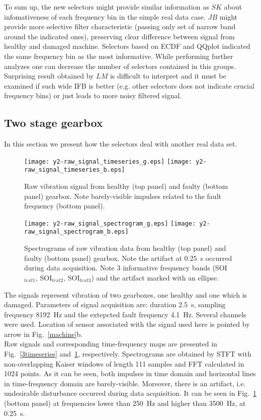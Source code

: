 \documentclass[3p,times]{elsarticle}
\begin{document}
To sum up, the new selectors might provide similar information as $SK$ about infomativeness of each frequency bin in the simple real data case. $JB$ might provide more selective filter characteristic (passing only set of narrow band around the indicated ones), preserving clear difference between signal from healthy and damaged machine. Selectors based on ECDF and QQplot indicated the same frequency bin as the most informative. While performing further analyzes one can decrease the number of selectors contained in this groups. Surprising result obtained by $LM$ is difficult to interpret and it must be examined if such wide IFB is better (e.g. other selectors does not indicate crucial frequency bins) or just leads to more noisy filtered signal.
\subsection{Two stage gearbox}\label{y2}
In this section we present how the selectors deal with another real data set.
\begin{figure}[!ht]
\begin{center}
\texttt{[image: y2-raw\_signal\_timeseries\_g.eps]}
\texttt{[image: y2-raw\_signal\_timeseries\_b.eps]}
\caption{Raw vibration signal from healthy (top panel) and faulty (bottom panel) gearbox. Note barely-visible impulses related to the fault frequency (bottom panel).}\label{3timeseries}
\texttt{[image: y2-raw\_signal\_spectrogram\_g.eps]}
\texttt{[image: y2-raw\_signal\_spectrogram\_b.eps]}
\caption{Spectrograms of raw vibration data from healthy (top panel) and faulty (bottom panel) gearbox. Note the artifact at 0.25~s occurred during data acquisition. Note 3 informative frequency bands (SOI$_{text{1}}$, SOI$_{text{2}}$, SOI$_{text{3}}$) and the artifact marked with an ellipse.}
\label{3spectrograms}
\end{center}
\end{figure}
The signals represent vibration of two gearboxes, one healthy and one which is damaged.  Parameters of signal acquisition are: duration 2.5~s, sampling frequency 8192~Hz and the extepcted fault frequency 4.1~Hz. Several channels were used. Location of sensor associated with the signal used here is pointed by arrow in Fig.~\ref{machine}b.\\
Raw signals and corresponding time-frequency maps are presented in Fig.~\ref{3timeseries} and~\ref{3spectrograms}, respectively. Spectrograms are obtained by STFT with non-overlapping Kaiser windows of length 111 samples and FFT calculated in 1024 points. As it can be seen, both impulses in time domain and horizontal lines in time-frequency domain are barely-visible. Moreover, there is an artifact, i.e. undesirable disturbance occurred during data acquisition. It can be seen in Fig.~\ref{3spectrograms} (bottom panel) at frequencies lower than 250~Hz and higher than 3500~Hz, at 0.25~s.\\
\end{document}
